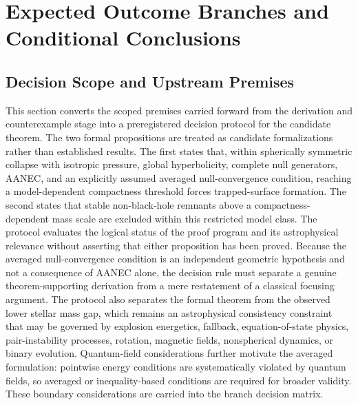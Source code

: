 \documentclass[conference]{IEEEtran}
\begin{document}
\section{Expected Outcome Branches and Conditional Conclusions}
\subsection{Decision Scope and Upstream Premises}
This section converts the scoped premises carried forward from the derivation and counterexample stage into a preregistered decision protocol for the candidate theorem. The two formal propositions are treated as candidate formalizations rather than established results. The first states that, within spherically symmetric collapse with isotropic pressure, global hyperbolicity, complete null generators, AANEC, and an explicitly assumed averaged null-convergence condition, reaching a model-dependent compactness threshold forces trapped-surface formation. The second states that stable non-black-hole remnants above a compactness-dependent mass scale are excluded within this restricted model class. The protocol evaluates the logical status of the proof program and its astrophysical relevance without asserting that either proposition has been proved. Because the averaged null-convergence condition is an independent geometric hypothesis and not a consequence of AANEC alone, the decision rule must separate a genuine theorem-supporting derivation from a mere restatement of a classical focusing argument. The protocol also separates the formal theorem from the observed lower stellar mass gap, which remains an astrophysical consistency constraint that may be governed by explosion energetics, fallback, equation-of-state physics, pair-instability processes, rotation, magnetic fields, nonspherical dynamics, or binary evolution. Quantum-field considerations further motivate the averaged formulation: pointwise energy conditions are systematically violated by quantum fields, so averaged or inequality-based conditions are required for broader validity. These boundary considerations are carried into the branch decision matrix.~\cite{cite_0ed84243cf171bc4}
\end{document}
